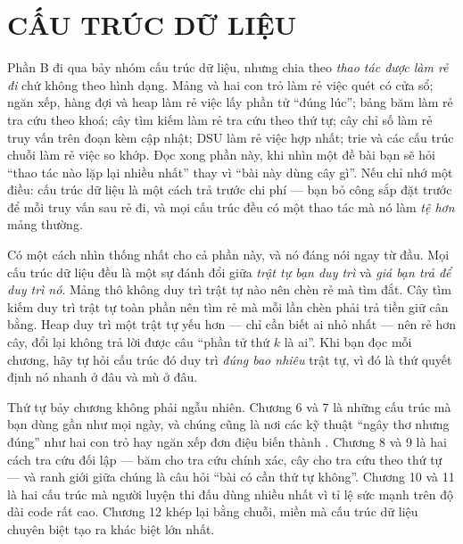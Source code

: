 \documentclass[../algorithm.tex]{subfiles}
\begin{document}
\part{CẤU TRÚC DỮ LIỆU}
\begin{tomtat}
Phần B đi qua bảy nhóm cấu trúc dữ liệu, nhưng chia theo \emph{thao tác được làm rẻ đi} chứ không theo hình dạng. Mảng và hai con trỏ làm rẻ việc quét có cửa sổ; ngăn xếp, hàng đợi và heap làm rẻ việc lấy phần tử ``đúng lúc''; bảng băm làm rẻ tra cứu theo khoá; cây tìm kiếm làm rẻ tra cứu theo thứ tự; cây chỉ số làm rẻ truy vấn trên đoạn kèm cập nhật; DSU làm rẻ việc hợp nhất; trie và các cấu trúc chuỗi làm rẻ việc so khớp. Đọc xong phần này, khi nhìn một đề bài bạn sẽ hỏi ``thao tác nào lặp lại nhiều nhất'' thay vì ``bài này dùng cây gì''. Nếu chỉ nhớ một điều: cấu trúc dữ liệu là một cách trả trước chi phí --- bạn bỏ công sắp đặt trước để mỗi truy vấn sau rẻ đi, và mọi cấu trúc đều có một thao tác mà nó làm \emph{tệ hơn} mảng thường.
\end{tomtat}

Có một cách nhìn thống nhất cho cả phần này, và nó đáng nói ngay từ đầu. Mọi cấu trúc dữ liệu đều là một sự đánh đổi giữa \emph{trật tự bạn duy trì} và \emph{giá bạn trả để duy trì nó}. Mảng thô không duy trì trật tự nào nên chèn rẻ mà tìm đắt. Cây tìm kiếm duy trì trật tự toàn phần nên tìm rẻ mà mỗi lần chèn phải trả tiền giữ cân bằng. Heap duy trì một trật tự yếu hơn --- chỉ cần biết ai nhỏ nhất --- nên rẻ hơn cây, đổi lại không trả lời được câu ``phần tử thứ \(k\) là ai''. Khi bạn đọc mỗi chương, hãy tự hỏi cấu trúc đó duy trì \emph{đúng bao nhiêu} trật tự, vì đó là thứ quyết định nó nhanh ở đâu và mù ở đâu.

Thứ tự bảy chương không phải ngẫu nhiên. Chương 6 và 7 là những cấu trúc mà bạn dùng gần như mọi ngày, và chúng cũng là nơi các kỹ thuật ``ngây thơ nhưng đúng'' như hai con trỏ hay ngăn xếp đơn điệu biến  thành . Chương 8 và 9 là hai cách tra cứu đối lập --- băm cho tra cứu chính xác, cây cho tra cứu theo thứ tự --- và ranh giới giữa chúng là câu hỏi ``bài có cần thứ tự không''. Chương 10 và 11 là hai cấu trúc mà người luyện thi đấu dùng nhiều nhất vì tỉ lệ sức mạnh trên độ dài code rất cao. Chương 12 khép lại bằng chuỗi, miền mà cấu trúc dữ liệu chuyên biệt tạo ra khác biệt lớn nhất.








\ifSubfilesClassLoaded{\printbibliography[title={Nguồn}]}{}
\end{document}
